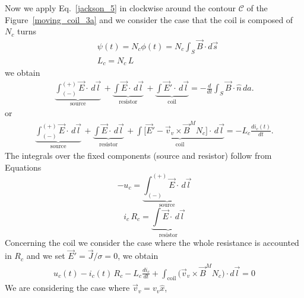 \documentclass[11pt,a4paper,oneside]{book}
\numberwithin{equation}{section}
\theoremstyle{it}
\theoremstyle{definition}
\begin{document}
Now we apply Eq.~\ref{jackson_5} in clockwise around the contour $\mathcal{C}$ 
of the Figure~\ref{moving_coil_3a} and we consider the case that the coil is 
composed of $N_c$ turns
\begin{equation}\label{}
	\begin{aligned}
		&\psi(t) = N_c\phi(t) = N_c \int_{S}^{}\vec{B}\cdot d\vec{s} \\[6pt]
		&L_c = N_c\,L
	\end{aligned}
\end{equation}
we obtain 
\begin{equation}\label{jackson_7}
	\begin{aligned}
		\underbrace{\int_{(-)}^{(+)}\vec{E}\cdot\,d\vec{l}}_{\text{source}} \, 
		+ \underbrace{\int\vec{E}\cdot\,d\vec{l}}_{\text{resistor}} \, + 
		\underbrace{\int\vec{E}'\cdot\,d\vec{l}}_{\text{coil}} = - 
		\frac{d}{dt}\int_S\vec{B}\cdot\hat{n}\,da.
	\end{aligned}
\end{equation} 
or
\begin{equation}\label{jackson_8}
	\begin{aligned}
		\underbrace{\int_{(-)}^{(+)}\vec{E}\cdot\,d\vec{l}}_{\text{source}} \, 
		+ \underbrace{\int\vec{E}\cdot\,d\vec{l}}_{\text{resistor}} \, + 
		\underbrace{\int\Big[\vec{E}' - 
		\vec{v}_v\times\vec{B}^MN_c\Big]\cdot\,d\vec{l}}_{\text{coil}} = - 
		L_c\frac{di_c(t)}{dt}.
	\end{aligned}
\end{equation} 
The integrals over the fixed components (source and resistor) follow from 
Equations
\begin{equation}\label{jackson_9}
	-u_c = \underbrace{\int_{(-)}^{(+)}\vec{E}\cdot\, d\vec{l}}_{\text{source}}
\end{equation} 
\begin{equation}\label{jackson_9b}
	i_c\,R_c = \underbrace{\int\vec{E}\cdot\,d\vec{l}}_{\text{resistor}}
\end{equation} 
Concerning the coil we consider the case where the whole resistance is 
accounted in $R_c$ and we set $\vec{E}'= \vec{J}/\sigma = 0$, we obtain
\begin{equation}\label{jackson_10}
	\begin{aligned}
		u_c(t) - i_c(t)\,R_c-L_c 
		\frac{di_c}{dt}+\int_{\text{coil}}\big(\vec{v}_v\times\vec{B}^MN_c\big)\cdot
		 d\vec{l}=0
	\end{aligned}
\end{equation} 
We are considering the case where $\vec{v}_v=v_v\hat{x}$, 
\end{document}

